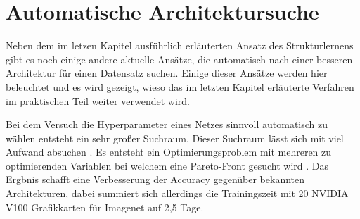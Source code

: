 \section{Automatische Architektursuche}
Neben dem im letzen Kapitel ausführlich erläuterten Ansatz des Strukturlernens gibt es noch einige andere aktuelle Ansätze, die automatisch nach einer besseren Architektur für einen Datensatz suchen. Einige dieser Ansätze werden hier beleuchtet und es wird gezeigt, wieso das im letzten Kapitel erläuterte Verfahren im praktischen Teil weiter verwendet wird.

Bei dem Versuch die Hyperparameter eines Netzes sinnvoll automatisch zu wählen entsteht ein sehr großer Suchraum. Dieser Suchraum lässt sich mit viel Aufwand absuchen \cite{dvolver}. Es entsteht ein Optimierungsproblem mit mehreren zu optimierenden Variablen bei welchem eine Pareto-Front gesucht wird \cite{dvolver}. Das Ergbnis schafft eine Verbesserung der Accuracy gegenüber bekannten Architekturen, dabei summiert sich allerdings die Trainingszeit mit 20 NVIDIA V100 Grafikkarten für Imagenet auf 2,5 Tage\cite{dvolver}.







\color{black}
